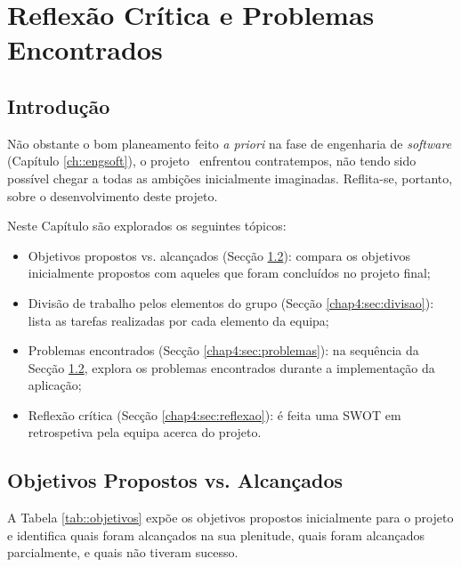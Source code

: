 \chapter{Reflexão Crítica e Problemas Encontrados}
\label{chap:reflexao}

\section{Introdução}
\label{chap4:sec:intro}

Não obstante o bom planeamento feito \textit{a priori} na fase de engenharia de \emph{software} (Capítulo \ref{ch::engsoft}), o projeto \appname~enfrentou contratempos, não tendo sido possível chegar a todas as ambições inicialmente imaginadas. Reflita-se, portanto, sobre o desenvolvimento deste projeto.

Neste Capítulo são explorados os seguintes tópicos:
\begin{itemize}
    \item Objetivos propostos vs. alcançados (Secção \ref{chap4:sec:opvsoa}): compara os objetivos
    inicialmente propostos com aqueles que foram concluídos no projeto final;
    \item Divisão de trabalho pelos elementos do grupo (Secção \ref{chap4:sec:divisao}): lista as tarefas
    realizadas por cada elemento da equipa;
    \item Problemas encontrados (Secção \ref{chap4:sec:problemas}): na sequência da Secção \ref{chap4:sec:opvsoa}, explora
    os problemas encontrados durante a implementação da aplicação;
    \item Reflexão crítica (Secção \ref{chap4:sec:reflexao}): é feita uma \ac{SWOT} em retrospetiva pela equipa acerca do projeto.
\end{itemize}


\section{Objetivos Propostos vs. Alcançados}
\label{chap4:sec:opvsoa}

A Tabela \ref{tab::objetivos} expõe os objetivos propostos inicialmente para o projeto e identifica quais foram alcançados na sua plenitude, quais foram alcançados parcialmente, e quais não tiveram sucesso.


